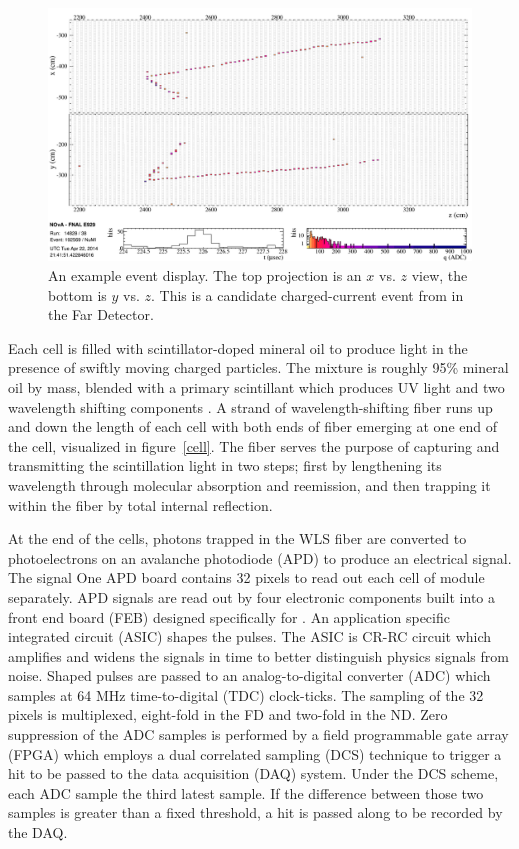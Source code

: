 \begin{figure}[t]
\begin{center}
\includegraphics[width=\textwidth]{figures/evd/evd_numu_cand.png}
\end{center}
\caption{An example \nova event display.  The top projection is an $x$ vs. $z$ view, the bottom is $y$ vs. $z$.  This is a candidate \numu charged-current event from in the Far Detector.}
\label{eventDisplay}
\end{figure}


Each cell is filled with scintillator-doped mineral oil to produce light in the presence of swiftly moving charged particles.  The mixture is roughly 95\% mineral oil by mass, blended with a primary scintillant which produces UV light and two wavelength shifting components \cite{mufson2015liquid}.  A strand of wavelength-shifting fiber runs up and down the length of each cell with both ends of fiber emerging at one end of the cell, visualized in figure~\ref{cell}.  The fiber serves the purpose of capturing and transmitting the scintillation light in two steps; first by lengthening its wavelength through molecular absorption and reemission, and then trapping it within the fiber by total internal reflection.

At the end of the cells, photons trapped in the WLS fiber are converted to photoelectrons on an avalanche photodiode (APD) to produce an electrical signal.  The signal One APD board contains 32 pixels to read out each cell of module separately.  APD signals are read out by four electronic components built into a front end board (FEB) designed specifically for \nova.  An application specific integrated circuit (ASIC) shapes the pulses.  The ASIC is CR-RC circuit which amplifies and widens the signals in time to better distinguish physics signals from noise.   Shaped pulses are passed to an analog-to-digital converter (ADC) which samples at 64 MHz time-to-digital (TDC) clock-ticks.  The sampling of the 32 pixels is multiplexed, eight-fold in the FD and two-fold in the ND.  Zero suppression of the ADC samples is performed by a field programmable gate array (FPGA) which employs a dual correlated sampling (DCS) technique to trigger a hit to be passed to the data acquisition (DAQ) system.  Under the DCS scheme, each ADC sample the third latest sample.  If the difference between those two samples is greater than a fixed threshold, a hit is passed along to be recorded by the DAQ.

